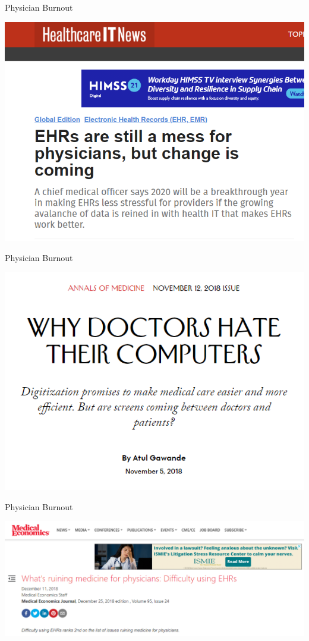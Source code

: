 \documentclass[10pt]{beamer}
\begin{document}
\begin{frame}[noframenumbering]{Physician Burnout}
\begin{center}
    \includegraphics[scale=.4]{graphics/News Clip1.PNG}
\end{center}
\end{frame}

\begin{frame}[noframenumbering]{Physician Burnout}
\begin{center}
    \includegraphics[scale=.5]{graphics/News Clip2.PNG}
\end{center}
\end{frame}

\begin{frame}[noframenumbering]{Physician Burnout}
\begin{center}
    \includegraphics[scale=.45]{graphics/News Clip3.PNG}
\end{center}
\end{frame}
\end{document}
